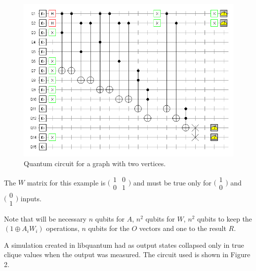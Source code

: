 \documentclass[a4paper,12pt]{article}
\begin{document}
\begin{figure}[!ht]
	\label{fig:qcircuit}
	\centering
	\includegraphics[width=1\textwidth]{qclique}
	\caption{Quantum circuit for a graph with two vertices.}
\end{figure}

The $W$ matrix for this example is $\bigl(\begin{smallmatrix}
1&0 \\ 0&1 \end{smallmatrix} \bigr)$ and must be true only for $\bigl(\begin{smallmatrix} 1\\0 \end{smallmatrix} \bigr)$ and $\bigl(\begin{smallmatrix} 0\\1 \end{smallmatrix} \bigr)$ inputs.

Note that will be necessary $n$ qubits for $A$, $n^2$ qubits for $W$, $n^2$ qubits to keep the $(1 \oplus A_i W_i)$ operations, $n$ qubits for the $O$ vectors and one to the result $R$.

A simulation created in libquantum had as output states collapsed only in true clique values when the output was measured. The circuit used is shown in Figure 2.
\end{document}
